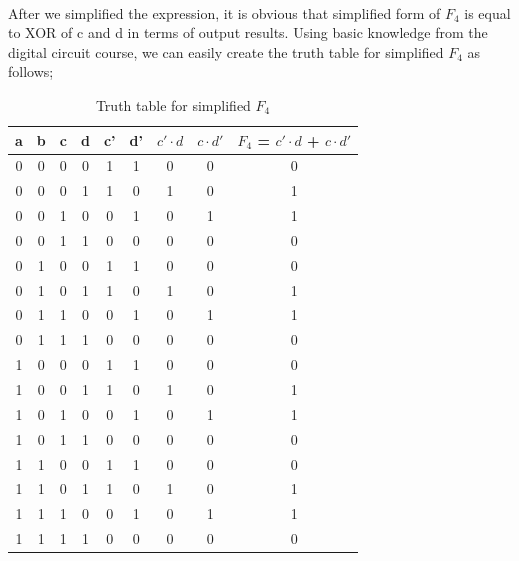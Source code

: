 \documentclass[pdftex,12pt,a4paper]{article}
\begin{document}
\clearpage

\paragraph{}
After we simplified the expression, it is obvious that simplified form of $F_{4}$ is equal to XOR of c and d in terms of output results. Using basic knowledge from the digital circuit course, we can easily create the truth table for simplified $F_{4}$ as follows; \newline \newline \newline

\begin{table}[h]
\centering
\begin{tabular}{|c|c|c|c|c|c|c|c|c|}
\hline
a & b & c & d & c' & d' & $c' \cdot d$ & $c \cdot d'$ & $F_{4}$ = $c' \cdot d$ + $c \cdot d'$ \\ \hline
0 & 0 & 0 & 0 & 1  & 1  & 0      & 0      & 0                    \\ \hline
0 & 0 & 0 & 1 & 1  & 0  & 1      & 0      & 1                    \\ \hline
0 & 0 & 1 & 0 & 0  & 1  & 0      & 1      & 1                    \\ \hline
0 & 0 & 1 & 1 & 0  & 0  & 0      & 0      & 0                    \\ \hline
0 & 1 & 0 & 0 & 1  & 1  & 0      & 0      & 0                    \\ \hline
0 & 1 & 0 & 1 & 1  & 0  & 1      & 0      & 1                    \\ \hline
0 & 1 & 1 & 0 & 0  & 1  & 0      & 1      & 1                    \\ \hline
0 & 1 & 1 & 1 & 0  & 0  & 0      & 0      & 0                    \\ \hline
1 & 0 & 0 & 0 & 1  & 1  & 0      & 0      & 0                    \\ \hline
1 & 0 & 0 & 1 & 1  & 0  & 1      & 0      & 1                    \\ \hline
1 & 0 & 1 & 0 & 0  & 1  & 0      & 1      & 1                    \\ \hline
1 & 0 & 1 & 1 & 0  & 0  & 0      & 0      & 0                    \\ \hline
1 & 1 & 0 & 0 & 1  & 1  & 0      & 0      & 0                    \\ \hline
1 & 1 & 0 & 1 & 1  & 0  & 1      & 0      & 1                    \\ \hline
1 & 1 & 1 & 0 & 0  & 1  & 0      & 1      & 1                    \\ \hline
1 & 1 & 1 & 1 & 0  & 0  & 0      & 0      & 0                    \\ \hline
\end{tabular}
\caption{Truth table for simplified $F_{4}$}
\label{Table 5}
\end{table}
\clearpage
\end{document}
